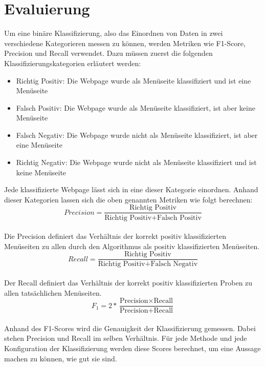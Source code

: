 \section{Evaluierung}
Um eine binäre Klassifizierung, also das Einordnen von Daten in zwei verschiedene Kategorieren messen zu können, werden Metriken wie F1-Score, Precision und Recall verwendet.
Dazu müssen zuerst die folgenden Klassifizierungskategorien erläutert werden:
\begin{itemize}
	\item Richtig Positiv: Die Webpage wurde als Menüseite klassifiziert und ist eine Menüseite
	\item Falsch Positiv: Die Webpage wurde als Menüseite klassifiziert, ist aber keine Menüseite
	\item Falsch Negativ: Die Webpage wurde nicht als Menüseite klassifiziert, ist aber eine Menüseite
	\item Richtig Negativ: Die Webpage wurde nicht als Menüseite klassifiziert und ist keine Menüseite
\end{itemize}
Jede klassifizierte Webpage lässt sich in eine dieser Kategorie einordnen.
Anhand dieser Kategorien lassen sich die oben genannten Metriken wie folgt berechnen:\\
\[Precision=\frac{\text{Richtig Positiv}}{\text{Richtig Positiv} + \text{Falsch Positiv}}\]\\
Die Precision definiert das Verhältnis der korrekt positiv klassifizierten Menüseiten zu allen durch den Algorithmus als positiv klassifizierten Menüseiten.\\
\[Recall=\frac{\text{Richtig Positiv}}{\text{Richtig Positiv} + \text{Falsch Negativ}}\]\\
Der Recall definiert das Verhältnis der korrekt positiv klassifizierten Proben zu allen tatsächlichen Menüseiten.\\
\[F_{1}=2*\frac{\text{Precision} \times \text{Recall}}{\text{Precision} + \text{Recall}}\]\\
Anhand des F1-Scores wird die Genauigkeit der Klassifizierung gemessen.
Dabei stehen Precision und Recall im selben Verhältnis.
Für jede Methode und jede Konfiguration der Klassifizierung werden diese Scores berechnet, um eine Aussage machen zu können, wie gut sie sind.

